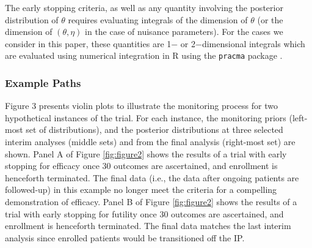 \documentclass[useAMS,usenatbib,referee]{biom}
\begin{document}
The early stopping criteria, as well as any quantity involving the posterior distribution of $\theta$ requires evaluating integrals of the dimension of $\theta$ (or the dimension of $(\theta,\eta)$ in the case of nuisance parameters).
%
For the cases we consider in this paper, these quantities are 1$-$ or 2$-$dimensional integrals which are evaluated using numerical integration in R \citep{R2017} using the \texttt{pracma} package \citep{Borchers2019}.

\subsubsection{Example Paths}
Figure 3 presents violin plots to illustrate the monitoring process for two hypothetical instances of the trial. 
%
For each instance, the monitoring priors (left-most set of distributions), and the posterior distributions at three selected interim analyses (middle sets) and from the final analysis (right-most set) are shown.
Panel A of Figure \ref{fig:figure2} shows the results of a trial with early stopping for efficacy once 30 outcomes are ascertained, and enrollment is henceforth terminated. 
%
The final data (i.e., the data after ongoing patients are followed-up) in this example no longer meet the criteria for a compelling demonstration of efficacy.
%
Panel B of Figure \ref{fig:figure2} shows the results of a trial with early stopping for futility once 30 outcomes are ascertained, and enrollment is henceforth terminated. The final data matches the last interim analysis since enrolled patients would be transitioned off the IP.
\end{document}
